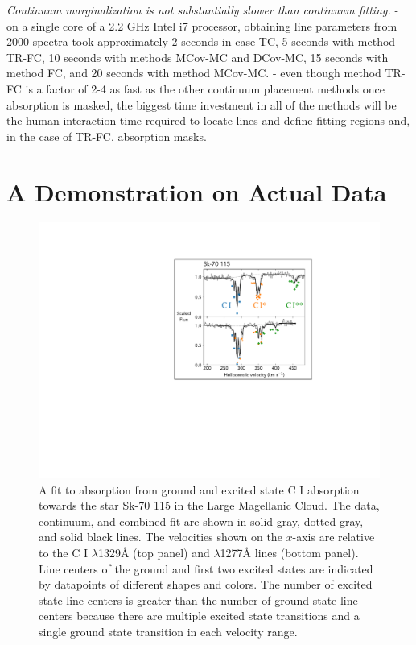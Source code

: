 \documentclass[trackchanges]{aastex62}
\begin{document}
{\emph{Continuum marginalization is not substantially slower than continuum fitting.}
- on a single core of a 2.2 GHz Intel i7 processor, obtaining line parameters from 2000 spectra took approximately 2 seconds in case TC, 5 seconds with method TR-FC, 10 seconds with methods MCov-MC and DCov-MC, 15 seconds with method FC, and 20 seconds with method MCov-MC.
- even though method TR-FC is a factor of 2-4 as fast as the other continuum placement methods once absorption is masked, the biggest time investment in all of the methods will be the human interaction time required to locate lines and define fitting regions and, in the case of TR-FC, absorption masks.

}


\section{A Demonstration on Actual Data}

\begin{figure}
  \centering
  \includegraphics{annotated-SK-70115.pdf}
  \caption{
  A fit to absorption from ground and excited state C \small{I} absorption towards the star Sk-70 115 in the Large Magellanic Cloud.
  The data, continuum, and combined fit are shown in solid gray, dotted gray, and solid black lines.
  The velocities shown on the $x$-axis are relative to the C \small{I} $\lambda$1329\AA{} (top panel) and $\lambda$1277\AA{} lines (bottom panel).
  Line centers of the ground and first two excited states are indicated by datapoints of different shapes and colors.
  The number of excited state line centers is greater than the number of ground state line centers because there are multiple excited state transitions and a single ground state transition in each velocity range.
  }
  \label{fig:demonstration-fit}
\end{figure}
\end{document}
